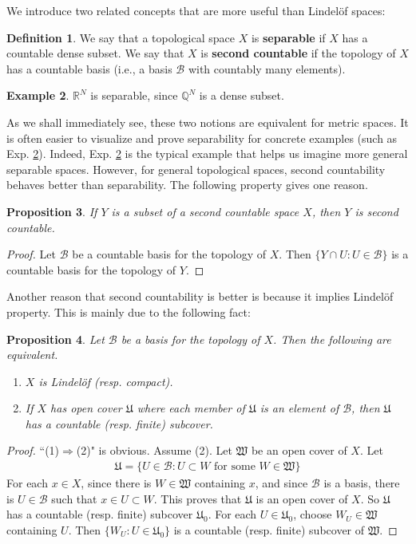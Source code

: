\documentclass[12pt,b5paper,notitlepage]{article}
\theoremstyle{definition}
\newtheorem{df}{Definition}[section]
\newtheorem{eg}[df]{Example}
\theoremstyle{plain}
\newtheorem{pp}[df]{Proposition}
\newcommand{\fk}{\mathfrak}
\newcommand{\mc}{\mathcal}
\newcommand{\Qbb}{\mathbb Q}
\newcommand{\Rbb}{\mathbb R}
\numberwithin{equation}{section}
\begin{document}
We introduce two related concepts that are more useful than Lindel\"of spaces:
\begin{df}
We say that a topological space $X$ is \textbf{separable}  if $X$ has a countable dense subset. We say that $X$ is \textbf{second countable}  if the topology of $X$ has a countable basis (i.e., a basis $\mc B$ with countably many elements).
\end{df}

\begin{eg}\label{lb248}
$\Rbb^N$ is separable, since $\Qbb^N$ is a dense subset. 
\end{eg}


As we shall immediately see, these two notions are equivalent for metric spaces. It is often easier to visualize and prove separability for concrete examples (such as Exp. \ref{lb248}). Indeed, Exp. \ref{lb248} is the typical example that helps us imagine more general separable spaces. However, for general topological spaces, second countability behaves better than separability.  The following property gives one reason.

\begin{pp}\label{lb475}
If $Y$ is a subset of a second countable space $X$, then $Y$ is second countable.
\end{pp}

\begin{proof}
Let $\mc B$ be a countable basis for the topology of $X$. Then $\{Y\cap U:U\in\mc B\}$ is a countable basis for the topology of $Y$.
\end{proof}
Another reason that second countability is better is because it implies Lindel\"of property. This is mainly due to the following fact:

\begin{pp}\label{lb249}
Let $\mc B$ be a basis for the topology of $X$. Then the following are equivalent.
\begin{enumerate}[label=(\arabic*)]
\item $X$ is Lindel\"of (resp. compact).
\item If $X$ has open cover $\fk U$ where each member of $\fk U$ is an element of $\mc B$, then $\fk U$ has a countable (resp. finite) subcover.
\end{enumerate}
\end{pp}

\begin{proof}
``(1)$\Rightarrow$(2)" is obvious.  Assume (2). Let $\fk W$ be an open cover of $X$. Let
\begin{align*}
\fk U=\{U\in \mc B:U\subset W\text{ for some }W\in\fk W\}
\end{align*} 
For each $x\in X$, since there is $W\in\fk W$ containing $x$, and since $\mc B$ is a basis, there is $U\in\mc B$ such that $x\in U\subset W$. This proves that $\fk U$ is an open cover of $X$. So $\fk U$ has a countable (resp. finite) subcover $\fk U_0$. For each $U\in\fk U_0$, choose $W_U\in\fk W$ containing $U$. Then $\{W_U:U\in\fk U_0\}$ is a countable (resp. finite) subcover of $\fk W$.
\end{proof}
\end{document}
